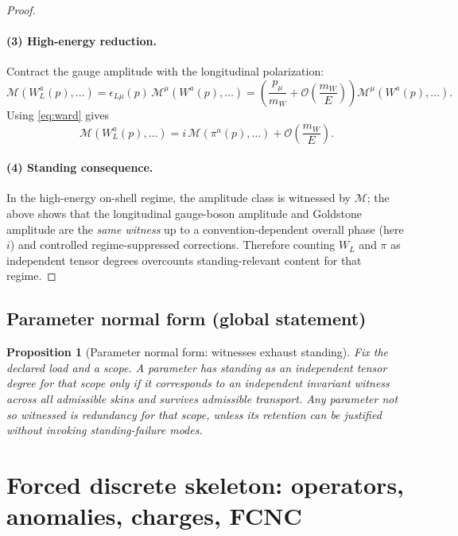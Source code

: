 \documentclass[11pt]{article}
\newtheorem{proposition}[definition]{Proposition}
\theoremstyle{remark}
\newcommand{\cO}{\mathcal{O}}
\begin{document}
\begin{proof}
\paragraph{(3) High-energy reduction.}
Contract the gauge amplitude with the longitudinal polarization:
\begin{equation}
\mathcal{M}(W_L^a(p),\dots)
=
\epsilon_{L\mu}(p)\,\mathcal{M}^\mu(W^a(p),\dots)
=
\left(\frac{p_\mu}{m_W}+\cO\!\left(\frac{m_W}{E}\right)\right)\mathcal{M}^\mu(W^a(p),\dots).
\end{equation}
Using \eqref{eq:ward} gives
\begin{equation}
\mathcal{M}(W_L^a(p),\dots)
=
i\,\mathcal{M}(\pi^a(p),\dots)+\cO\!\left(\frac{m_W}{E}\right).
\end{equation}

\paragraph{(4) Standing consequence.}
In the high-energy on-shell regime, the amplitude class is witnessed by $\mathcal{M}$; the above shows
that the longitudinal gauge-boson amplitude and Goldstone amplitude are the \emph{same witness} up to a convention-dependent overall phase (here $i$) and
controlled regime-suppressed corrections. Therefore counting $W_L$ and $\pi$ as independent tensor
degrees overcounts standing-relevant content for that regime.
\end{proof}

\subsection{Parameter normal form (global statement)}

\begin{proposition}[Parameter normal form: witnesses exhaust standing]\label{prop:normal-form}
Fix the declared load and a scope. A parameter has standing as an independent tensor degree for that
scope only if it corresponds to an independent invariant witness across all admissible skins and
survives admissible transport. Any parameter not so witnessed is redundancy for that scope, unless
its retention can be justified without invoking standing-failure modes.
\end{proposition}

\section{Forced discrete skeleton: operators, anomalies, charges, FCNC}
\end{document}
